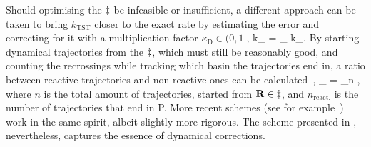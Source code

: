 
Should optimising the $\ddagger$ be infeasible or insufficient, a different approach can be taken to bring $k_\text{TST}$ closer to the exact rate by estimating the error and correcting for it with a multiplication factor $\kappa_\text{D} \in (0, 1]$,
k_ = \kappa_ \text{ } k_.
\eeq
By starting dynamical trajectories from the $\ddagger$, which must still be reasonably good, and counting the recrossings while tracking which basin the trajectories end in, a ratio between reactive trajectories and non-reactive ones can be calculated~\cite{dynamical-corrections-keck-1962},
\kappa_ = \lim_{n \rightarrow \infty} ,
\eeq
where $n$ is the total amount of trajectories, started from ${\mathrm{\mathbf{\bm{R}}}} \in \ddagger$, and $n_\text{react.}$ is the number of trajectories that end in P.
More recent schemes (see for example~\cite{vtst-2005, dynamical-corrections-chandler-1977, dynamical-corrections-bennett-1977}) work in the same spirit, albeit slightly more rigorous.
The scheme presented in , nevertheless, captures the essence of dynamical corrections.
